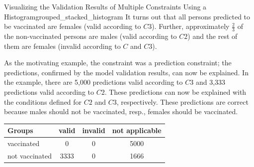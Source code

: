 \begin{Bsp}{Visualizing the Validation Results of Multiple Constraints Using a Histogram}{grouped_stacked_histogram}
It turns out that all persons predicted to be vaccinated are females (valid according to $C3$). Further, approximately $\frac{2}{3}$ of the non-vaccinated persons are males (valid according to $C2$) and the rest of them are females (invalid according to $C$ and $C3$). 

As the motivating example, the constraint was a prediction constraint; the predictions, confirmed by the model validation results, can now be explained. In the example, there are 5,000 predictions valid according to $C3$ and 3,333 predictions valid according to $C2$. These predictions can now be explained with the conditions defined for $C2$ and $C3$, respectively. These predictions are correct because males should not be vaccinated, resp., females should be vaccinated.

   \captionsetup{type=htypei}
   \begin{minipage}[t]{\linewidth}
        \vspace{1ex}
        \centering
        \begin{tabular}{l|ccc}
            \toprule
             Groups & valid & invalid & not applicable \\
             \midrule
             vaccinated & 0 & 0 & 5000 \\
             not vaccinated & 3333 & 0 & 1666 \\
             \bottomrule
        \end{tabular}
        \label{fig:frequency_distribution_table_second_motivating_constraint}
    \end{minipage}
   

\end{Bsp}

